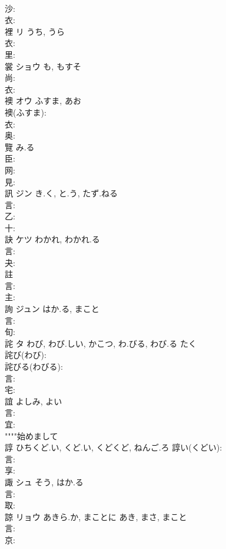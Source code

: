 \documentclass[8pt]{extreport}
\begin{document}
\begin{CJK}{UTF8}{min}
\\	沙: 
\\	衣: 
\\	裡	リ	うち, うら		
\\	衣: 
\\	里: 
\\	裳	ショウ	も, もすそ		
\\	尚: 
\\	衣: 
\\	襖	オウ	ふすま, あお		
\\	襖(ふすま): 
\\	衣: 
\\	奥: 
\\	覽		み.る				
\\	臣: 
\\	网: 
\\	見: 
\\	訊	ジン	き.く, と.う, たず.ねる		
\\	言: 
\\	乙: 
\\	十: 
\\	訣	ケツ	わかれ, わかれ.る		
\\	言: 
\\	夬: 
\\	註						
\\	言: 
\\	主: 
\\	詢	ジュン	はか.る, まこと		
\\	言: 
\\	旬: 
\\	詫	タ	わび, わび.しい, かこつ, わ.びる, わび.る	たく	
\\	詫び(わび): 
\\	詫びる(わびる): 
\\	言: 
\\	宅: 
\\	誼		よしみ, よい				
\\	言: 
\\	宜: 
\\	""""始めまして
\\	諄		ひちくど.い, くど.い, くどくど, ねんご.ろ			諄い(くどい): 
\\	言: 
\\	享: 
\\	諏	シュ	そう, はか.る		
\\	言: 
\\	取: 
\\	諒	リョウ	あきら.か, まことに	あき, まさ, まこと	
\\	言: 
\\	京: 

\end{CJK}
\end{document}
